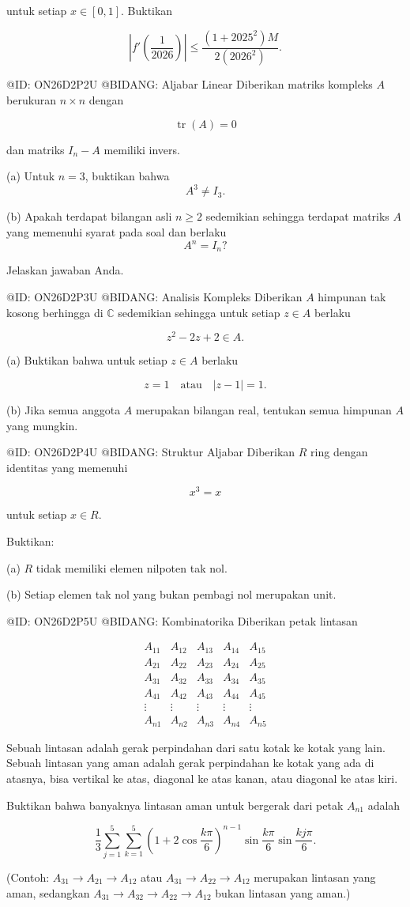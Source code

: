 untuk setiap $x\in[0,1]$. Buktikan

$$
\left|f'\left(\frac1{2026}\right)\right|
\le
\frac{(1+2025^2)M}{2(2026^2)}.
$$

@ID: ON26D2P2U
@BIDANG: Aljabar Linear
Diberikan matriks kompleks $A$ berukuran $n\times n$ dengan

$$
\operatorname{tr}(A)=0
$$

dan matriks $I_n-A$ memiliki invers.

(a) Untuk $n=3$, buktikan bahwa
$$
A^3\ne I_3.
$$

(b) Apakah terdapat bilangan asli $n\ge2$ sedemikian sehingga terdapat matriks $A$ yang memenuhi syarat pada soal dan berlaku
$$
A^n=I_n?
$$

Jelaskan jawaban Anda.

@ID: ON26D2P3U
@BIDANG: Analisis Kompleks
Diberikan $A$ himpunan tak kosong berhingga di $\mathbb C$ sedemikian sehingga untuk setiap $z\in A$ berlaku

$$
z^2-2z+2\in A.
$$

(a) Buktikan bahwa untuk setiap $z\in A$ berlaku

$$
z=1
\quad\text{atau}\quad
|z-1|=1.
$$

(b) Jika semua anggota $A$ merupakan bilangan real, tentukan semua himpunan $A$ yang mungkin.

@ID: ON26D2P4U
@BIDANG: Struktur Aljabar
Diberikan $R$ ring dengan identitas yang memenuhi

$$
x^3=x
$$

untuk setiap $x\in R$.

Buktikan:

(a) $R$ tidak memiliki elemen nilpoten tak nol.

(b) Setiap elemen tak nol yang bukan pembagi nol merupakan unit.

@ID: ON26D2P5U
@BIDANG: Kombinatorika
Diberikan petak lintasan

$$
\begin{array}{ccccc}
A_{11} & A_{12} & A_{13} & A_{14} & A_{15}\\
A_{21} & A_{22} & A_{23} & A_{24} & A_{25}\\
A_{31} & A_{32} & A_{33} & A_{34} & A_{35}\\
A_{41} & A_{42} & A_{43} & A_{44} & A_{45}\\
\vdots & \vdots & \vdots & \vdots & \vdots\\
A_{n1} & A_{n2} & A_{n3} & A_{n4} & A_{n5}
\end{array}
$$

Sebuah lintasan adalah gerak perpindahan dari satu kotak ke kotak yang lain. Sebuah lintasan yang aman adalah gerak perpindahan ke kotak yang ada di atasnya, bisa vertikal ke atas, diagonal ke atas kanan, atau diagonal ke atas kiri.

Buktikan bahwa banyaknya lintasan aman untuk bergerak dari petak $A_{n1}$ adalah

$$
\frac13
\sum_{j=1}^{5}
\sum_{k=1}^{5}
\left(1+2\cos\frac{k\pi}{6}\right)^{n-1}
\sin\frac{k\pi}{6}
\sin\frac{kj\pi}{6}.
$$

(Contoh: $A_{31}\to A_{21}\to A_{12}$ atau $A_{31}\to A_{22}\to A_{12}$ merupakan lintasan yang aman, sedangkan $A_{31}\to A_{32}\to A_{22}\to A_{12}$ bukan lintasan yang aman.)



